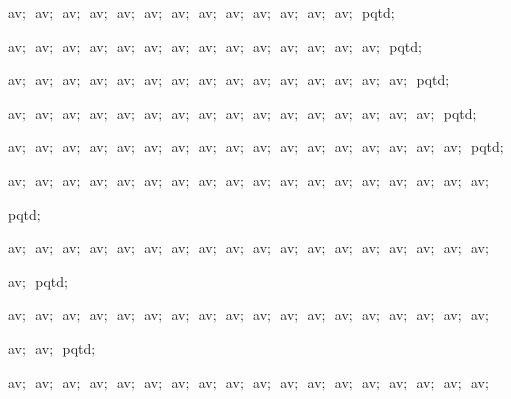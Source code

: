 {\vspace{\neglskip}\mbox{\blc  \blk\idt  av$;$\ av$;$\ av$;$\ av$;$\ av$;$\ av$;$\ av$;$\ av$;$\ av$;$\ av$;$\ av$;$\ av$;$\ av$;$\ pqtd$;$}\par 
\vspace{\neglskip}\mbox{\blc  \blk\idt  av$;$\ av$;$\ av$;$\ av$;$\ av$;$\ av$;$\ av$;$\ av$;$\ av$;$\ av$;$\ av$;$\ av$;$\ av$;$\ av$;$\ pqtd$;$}\par 
\vspace{\neglskip}\mbox{\blc  \blk\idt  av$;$\ av$;$\ av$;$\ av$;$\ av$;$\ av$;$\ av$;$\ av$;$\ av$;$\ av$;$\ av$;$\ av$;$\ av$;$\ av$;$\ av$;$\ pqtd$;$}\par 
\vspace{\neglskip}\mbox{\blc  \blk\idt  av$;$\ av$;$\ av$;$\ av$;$\ av$;$\ av$;$\ av$;$\ av$;$\ av$;$\ av$;$\ av$;$\ av$;$\ av$;$\ av$;$\ av$;$\ av$;$\ pqtd$;$}\par 
\vspace{\neglskip}\mbox{\blc  \blk\idt  av$;$\ av$;$\ av$;$\ av$;$\ av$;$\ av$;$\ av$;$\ av$;$\ av$;$\ av$;$\ av$;$\ av$;$\ av$;$\ av$;$\ av$;$\ av$;$\ av$;$\ pqtd$;$}\par 
\vspace{\neglskip}\mbox{\blc  \blk\idt  av$;$\ av$;$\ av$;$\ av$;$\ av$;$\ av$;$\ av$;$\ av$;$\ av$;$\ av$;$\ av$;$\ av$;$\ av$;$\ av$;$\ av$;$\ av$;$\ av$;$\ av$;$\ }\par 
\vspace{\neglskip}\mbox{\blc  \blk\idt  pqtd$;$}\par 
\vspace{\neglskip}\mbox{\blc  \blk\idt  av$;$\ av$;$\ av$;$\ av$;$\ av$;$\ av$;$\ av$;$\ av$;$\ av$;$\ av$;$\ av$;$\ av$;$\ av$;$\ av$;$\ av$;$\ av$;$\ av$;$\ av$;$\ }\par 
\vspace{\neglskip}\mbox{\blc  \blk\idt  av$;$\ pqtd$;$}\par 
\vspace{\neglskip}\mbox{\blc  \blk\idt  av$;$\ av$;$\ av$;$\ av$;$\ av$;$\ av$;$\ av$;$\ av$;$\ av$;$\ av$;$\ av$;$\ av$;$\ av$;$\ av$;$\ av$;$\ av$;$\ av$;$\ av$;$\ }\par 
\vspace{\neglskip}\mbox{\blc  \blk\idt  av$;$\ av$;$\ pqtd$;$}\par 
\vspace{\neglskip}\mbox{\blc  \blk\idt  av$;$\ av$;$\ av$;$\ av$;$\ av$;$\ av$;$\ av$;$\ av$;$\ av$;$\ av$;$\ av$;$\ av$;$\ av$;$\ av$;$\ av$;$\ av$;$\ av$;$\ av$;$\ }\par 
}

